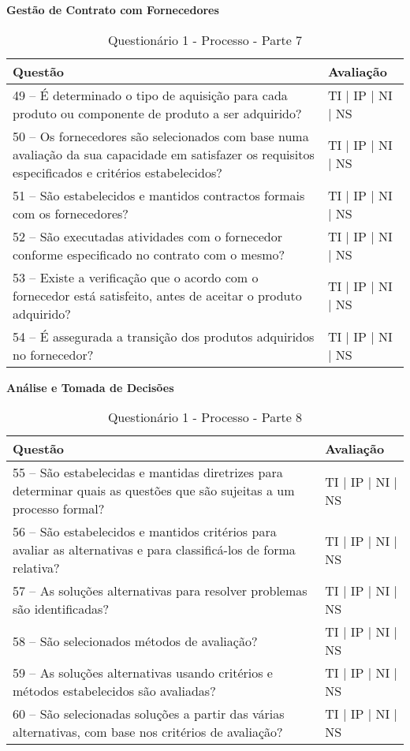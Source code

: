 \documentclass[openany,10pt,a4paper]{article}
\begin{document}
\begin{appendix}
\begin{table}[h]
\textbf{Gestão de Contrato com Fornecedores}
	\centering
	\caption{Questionário 1 - Processo - Parte 7}
	\begin{tabular}{p{3.5in}p{2in}}		
		\toprule
		\textbf{Questão}  & \textbf{Avaliação}\\ 
		\midrule
		49 – É determinado o tipo de aquisição para cada produto ou componente de produto a ser 
adquirido?
 & TI | IP | NI | NS \\
        \midrule
		50 – Os fornecedores são selecionados com base numa avaliação da sua capacidade em 
satisfazer os requisitos especificados e critérios estabelecidos?
 & TI | IP | NI | NS \\
		\midrule
		51 – São estabelecidos e mantidos contractos formais com os fornecedores?
 & TI | IP | NI | NS \\
		\midrule
        52 – São executadas atividades com o fornecedor conforme especificado no contrato com o 
mesmo?
 & TI | IP | NI | NS \\
		\midrule
		53 – Existe a verificação que o acordo com o fornecedor está satisfeito, antes de aceitar o 
produto adquirido?
  & TI | IP | NI | NS \\
		\midrule
		54 – É assegurada a transição dos produtos adquiridos no fornecedor?
 & TI | IP | NI | NS \\
		\bottomrule
	\end{tabular} 
	\label{tab:tabela1}
\end{table}

\begin{table}[h]
\textbf{Análise e Tomada de Decisões}
	\centering
	\caption{Questionário 1 - Processo - Parte 8}
	\begin{tabular}{p{3.5in}p{2in}}		
		\toprule
		\textbf{Questão}  & \textbf{Avaliação}\\ 
		\midrule
		55 – São estabelecidas e mantidas diretrizes para determinar quais as questões que são sujeitas 
a um processo formal?
 & TI | IP | NI | NS \\
        \midrule
		56 – São estabelecidos e mantidos critérios para avaliar as alternativas e para classificá-los de 
forma relativa?
 & TI | IP | NI | NS \\
		\midrule
		57 – As soluções alternativas para resolver problemas são identificadas?
 & TI | IP | NI | NS \\
		\midrule
        58 – São selecionados métodos de avaliação?
 & TI | IP | NI | NS \\
		\midrule
		59 – As soluções alternativas usando critérios e métodos estabelecidos são avaliadas?
  & TI | IP | NI | NS \\
		\midrule
		60 – São selecionadas soluções a partir das várias alternativas, com base nos critérios de 
avaliação?
 & TI | IP | NI | NS \\
		\bottomrule
	\end{tabular} 
	\label{tab:tabela1}
\end{table}


\end{appendix}
\end{document}
